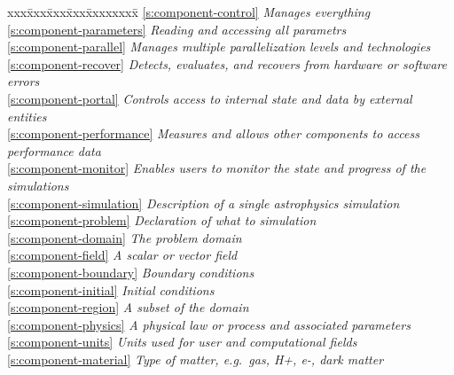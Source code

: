 \begin{tabbing}
xxx\=xxx\=xxx\=xxx\=xxxxxxxx\= \kill
\ref{s:component-control} \>           \>\>\>\> \textit{Manages everything}  \\
\ref{s:component-parameters} \>\>        \>\>\> \textit{Reading and accessing all parametrs} \\
\ref{s:component-parallel}  \>\>          \>\>\> \textit{Manages multiple parallelization levels and technologies} \\
\ref{s:component-recover}  \>\>          \>\>\> \textit{Detects, evaluates, and recovers from hardware or software errors} \\
\ref{s:component-portal}  \>\>            \>\>\> \textit{Controls access to internal state and data by external entities} \\
\ref{s:component-performance}  \>\>       \>\>\> \textit{Measures and allows other components to access performance data} \\
\ref{s:component-monitor}  \>\>           \>\>\> \textit{Enables users to monitor the state and progress of the simulations} \\
\ref{s:component-simulation}  \>        \>\>\>\> \textit{Description of a single astrophysics simulation} \\
\ref{s:component-problem}  \>\>           \>\>\> \textit{Declaration of what to simulation} \\
\ref{s:component-domain}  \>\>\>            \>\> \textit{The problem domain} \\
\ref{s:component-field}  \>\>\>             \>\> \textit{A scalar or vector field} \\
\ref{s:component-boundary}  \>\>\>          \>\> \textit{Boundary conditions} \\
\ref{s:component-initial}  \>\>\>           \>\> \textit{Initial conditions} \\
\ref{s:component-region}  \>\>\>\>            \> \textit{A subset of the domain} \\
\ref{s:component-physics}  \>\>           \>\>\> \textit{A physical law or process and associated parameters} \\
\ref{s:component-units}  \>\>\>             \>\> \textit{Units used for user and computational fields} \\
\ref{s:component-material}  \>\>\>          \>\> \textit{Type of matter, e.g.~gas, H+, e-, dark matter} \\

\end{tabbing}
